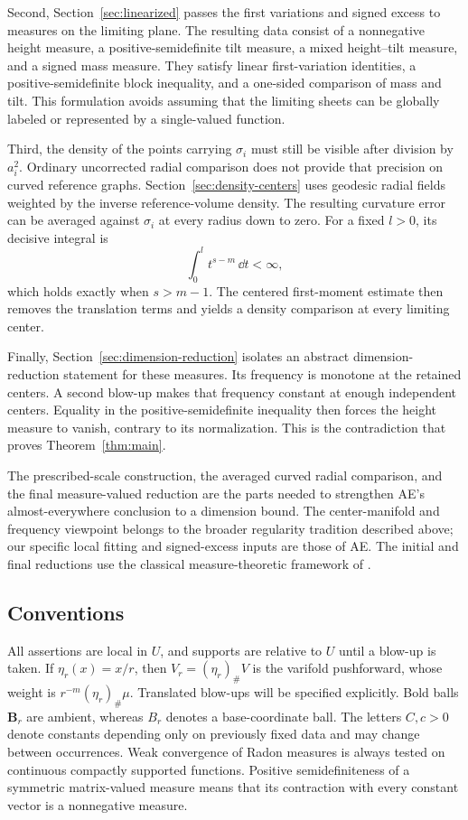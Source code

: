 Second, Section~\ref{sec:linearized} passes the first variations and
signed excess to measures on the limiting plane. The resulting data
consist of a nonnegative height measure, a positive-semidefinite tilt
measure, a mixed height--tilt measure, and a signed mass measure.
They satisfy linear first-variation identities, a positive-semidefinite
block inequality, and a one-sided comparison of mass and tilt. This
formulation avoids assuming that the limiting sheets can be globally
labeled or represented by a single-valued function.

Third, the density of the points carrying $\sigma_i$ must still be visible
after division by $a_i^2$. Ordinary uncorrected radial comparison
does not provide that precision on curved reference graphs.
Section~\ref{sec:density-centers} uses geodesic radial fields weighted by
the inverse reference-volume density. The resulting curvature error
can be averaged against $\sigma_i$ at every radius down to zero. For a
fixed $l>0$, its decisive integral is
\[
 \int_0^l t^{s-m}\,\dd t<\infty,
\]
which holds exactly when $s>m-1$. The centered first-moment estimate
then removes the translation terms and yields a density comparison
at every limiting center.

Finally, Section~\ref{sec:dimension-reduction} isolates an abstract
dimension-reduction statement for these measures. Its frequency is
monotone at the retained centers. A second blow-up makes that frequency
constant at enough independent centers. Equality in the
positive-semidefinite inequality then forces the height measure to
vanish, contrary to its normalization. This is the contradiction that
proves Theorem~\ref{thm:main}.

The prescribed-scale construction, the averaged curved radial
comparison, and the final measure-valued reduction are the parts needed
to strengthen AE's almost-everywhere conclusion to a dimension bound.
The center-manifold and frequency viewpoint belongs to the broader
regularity tradition described above; our specific local fitting and
signed-excess inputs are those of AE. The initial and final reductions
use the classical measure-theoretic framework of
\cite{Federer1969,Mattila1995}.

\subsection{Conventions}
All assertions are local in $U$, and supports are relative to $U$ until
a blow-up is taken. If $\eta_r(x)=x/r$, then $V_r=(\eta_r)_\#V$ is the
varifold pushforward, whose weight is $r^{-m}(\eta_r)_\#\mu$.
Translated blow-ups will be specified explicitly. Bold balls $\mathbf B_r$ are ambient, whereas
$B_r$ denotes a base-coordinate ball. The letters $C,c>0$ denote
constants depending only on previously fixed data and may change
between occurrences. Weak convergence of Radon measures is always
tested on continuous compactly supported functions. Positive
semidefiniteness of a symmetric matrix-valued measure means that its contraction
with every constant vector is a nonnegative measure.
